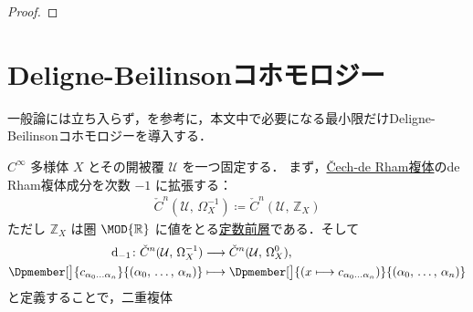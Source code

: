 \documentclass[TQFT_main]{subfiles}
\begin{document}
\begin{proof}
    
\end{proof}


\section{Deligne-Beilinsonコホモロジー}

一般論には立ち入らず，\cite[p.21, Appendix A]{Bauer2005DB}を参考に，本文中で必要になる最小限だけDeligne-Beilinsonコホモロジーを導入する．

$C^\infty$ 多様体 $X$ とその開被覆 $\mathcal{U}$ を一つ固定する．
まず，\hyperref[ex:Cech-deRham]{\v{C}ech-de Rham複体}のde Rham複体成分を次数 $-1$ に拡張する：
\begin{align}
    \label{def:Cech-complex-1}
    \check{C}^{n} (\mathcal{U},\, \Omega^{-1}_X) \coloneqq \check{C}^n (\mathcal{U},\, \mathbb{Z}_X)
\end{align}
ただし $\mathbb{Z}_X$ は圏 $\MOD{\mathbb{R}}$ に値をとる\hyperref[ex:constant-presheaf]{定数前層}である．そして
\begin{align}
    \dd_{-1} \colon \check{C}^{n} (\mathcal{U},\, \Omega^{-1}_X) &\lto \check{C}^{n} (\mathcal{U},\, \Omega^{0}_X), \\
    \Dpmember[\big]{c_{\alpha_0 \dots \alpha_n}}{(\alpha_0,\, \dots ,\, \alpha_n)} &\lmto \Dpmember[\big]{(x \lmto c_{\alpha_0 \dots \alpha_n})}{(\alpha_0,\, \dots ,\, \alpha_n)}
\end{align}
と定義することで，二重複体
\begin{center}
\end{center}
\end{document}
